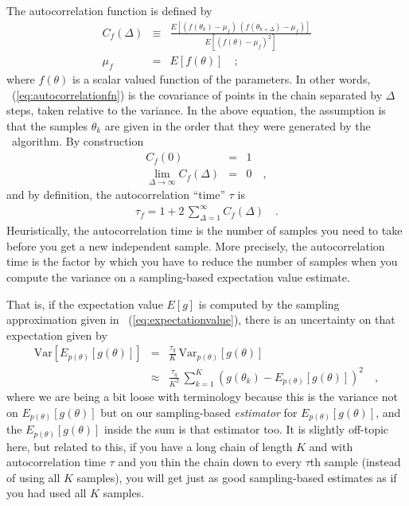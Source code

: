 \documentclass[modern]{aastex61}
\newcommand{\MCMC}{\acronym{MCMC}}
\newcommand{\Var}{\mathrm{Var}}
\newcommand{\pars}{\theta}
\begin{document}
The autocorrelation function is defined by
\begin{eqnarray}
C_f(\Delta) &\equiv& \frac{E[(f(\pars_k)-\mu_f)\,(f(\pars_{k+\Delta})-\mu_f)]}
                          {E[(f(\pars)-\mu_f)^2]}
\label{eq:autocorrelationfn}\\
\mu_f &=& E[f(\pars)]
\quad ;
\end{eqnarray}
where $f(\pars)$ is a scalar valued function of the parameters.
In other words, \equationname~(\ref{eq:autocorrelationfn}) is the covariance
of points in the chain separated by $\Delta$ steps, taken relative to the
variance.
In the above equation, the assumption is that the samples $\pars_k$ are
given in the order that they were generated by the \MCMC\ algorithm.
By construction
\begin{eqnarray}
C_f(0) &=& 1
\\
\lim_{\Delta\rightarrow\infty} C_f(\Delta) &=& 0
\quad ,
\end{eqnarray}
and by definition, the autocorrelation ``time'' $\tau$ is
\begin{eqnarray}
\tau_f = 1 + 2\,\sum_{\Delta = 1}^{\infty} C_f(\Delta)
\label{eq:autocorrelationtime}\quad.
\end{eqnarray}
Heuristically, the autocorrelation time is the number of samples you
need to take before you get a new independent sample.
More precisely, the autocorrelation time is the factor by which you
have to reduce the number of samples when you compute the variance on
a sampling-based expectation value estimate.

That is, if the expectation value $E[g]$ is computed by the sampling
approximation given in \equationname~(\ref{eq:expectationvalue}),
there is an uncertainty on that expectation given by
\begin{eqnarray}
  \Var[E_{p(\pars)}[g(\pars)]] &=& \frac{\tau_q}{K}\,\Var_{p(\pars)}[g(\pars)]
  \\
  &\approx& \frac{\tau_q}{K^2}\,\sum_{k=1}^K \left(g(\pars_k) -
    E_{p(\pars)}[g(\pars)]\right)^2
  \quad,
\label{eq:tauvar}
\end{eqnarray}
where we are being a bit loose with terminology because this is the
variance not on $E_{p(\pars)}[g(\pars)]$ but on our sampling-based
\emph{estimator} for
$E_{p(\pars)}[g(\pars)]$, and the $E_{p(\pars)}[g(\pars)]$ inside the sum is
that estimator too.
It is slightly off-topic here, but related to this, if you have a long
chain of length $K$ and with autocorrelation time $\tau$ and you thin
the chain down to every $\tau$th sample (instead of using all $K$
samples), you will get just as good sampling-based estimates as if you
had used all $K$ samples.
\end{document}
